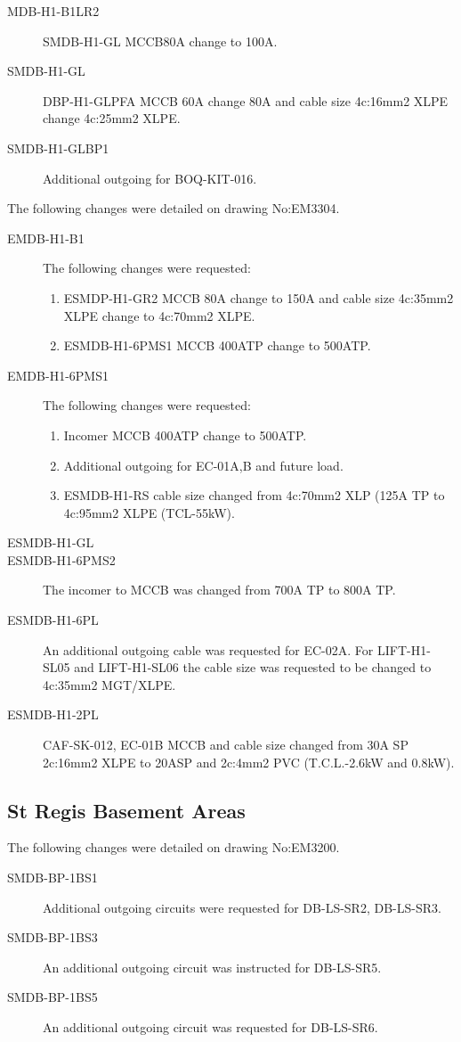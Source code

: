 \begin{description}
\item[MDB-H1-B1LR2] SMDB-H1-GL MCCB80A change to 100A.
\item[SMDB-H1-GL] DBP-H1-GLPFA MCCB 60A change 80A and cable size 4c:16mm2 XLPE change 4c:25mm2 XLPE.
\item[SMDB-H1-GLBP1] Additional outgoing for BOQ-KIT-016.
\end{description}

The following changes were detailed on drawing No:EM3304.

\begin{description}
\item[EMDB-H1-B1]  The following changes were requested:
   \begin{enumerate}
      \item ESMDP-H1-GR2 MCCB 80A change to 150A and cable size 4c:35mm2 XLPE change to 4c:70mm2 XLPE.
      \item ESMDB-H1-6PMS1 MCCB 400ATP change to 500ATP.
   \end{enumerate}
\item[EMDB-H1-6PMS1] The following changes were requested:
    \begin{enumerate}
       \item Incomer MCCB 400ATP change to 500ATP.
       \item Additional outgoing for EC-01A,B and future load.
       \item ESMDB-H1-RS cable size changed from 4c:70mm2 XLP (125A TP to 4c:95mm2 XLPE (TCL-55kW).
    \end{enumerate}
\item[ESMDB-H1-GL]
\item[ESMDB-H1-6PMS2]  The incomer to MCCB was changed from 700A TP to 800A TP.
\item[ESMDB-H1-6PL] An additional outgoing cable was requested for EC-02A. For LIFT-H1-SL05 and LIFT-H1-SL06 the cable size was requested to be changed to 4c:35mm2 MGT/XLPE.
\item[ESMDB-H1-2PL] CAF-SK-012, EC-01B MCCB and cable size changed from 30A SP 2c:16mm2 XLPE to 20ASP and 2c:4mm2 PVC (T.C.L.-2.6kW and 0.8kW).
\end{description}

\subsection{St Regis Basement Areas}
The following changes were detailed on drawing No:EM3200.
\begin{description}
\item[SMDB-BP-1BS1] Additional outgoing circuits were requested for DB-LS-SR2, DB-LS-SR3.
\item[SMDB-BP-1BS3]  An additional outgoing circuit was instructed for DB-LS-SR5.
\item[SMDB-BP-1BS5] An additional outgoing circuit was requested for DB-LS-SR6.
\end{description}

